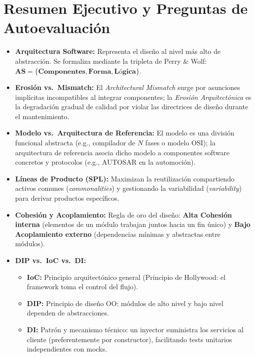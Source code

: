 \section{Resumen Ejecutivo y Preguntas de Autoevaluación}
\label{sec:resumen-autoevaluacion}

\begin{tcolorbox}[
  enhanced,
  colback=secondary!5!bglight,
  colframe=secondary,
  arc=3mm,
  boxrule=1pt,
  title={\bfseries\color{white} Resumen Sintético de Conceptos Clave},
  coltitle=white
]
\begin{itemize}[leftmargin=1.5em]
  \item \textbf{Arquitectura Software:} Representa el diseño al nivel más alto de abstracción. Se formaliza mediante la tripleta de Perry \& Wolf: $\mathbf{AS = \{\text{Componentes}, \text{Forma}, \text{Lógica}\}}$.
  \item \textbf{Erosión vs.\ Mismatch:} El \emph{Architectural Mismatch} surge por asunciones implícitas incompatibles al integrar componentes; la \emph{Erosión Arquitectónica} es la degradación gradual de calidad por violar las directrices de diseño durante el mantenimiento.
  \item \textbf{Modelo vs.\ Arquitectura de Referencia:} El modelo es una división funcional abstracta (e.g., compilador de $N$ fases o modelo OSI); la arquitectura de referencia asocia dicho modelo a componentes software concretos y protocolos (e.g., AUTOSAR en la automoción).
  \item \textbf{Líneas de Producto (SPL):} Maximizan la reutilización compartiendo activos comunes (\emph{commonalities}) y gestionando la variabilidad (\emph{variability}) para derivar productos específicos.
  \item \textbf{Cohesión y Acoplamiento:} Regla de oro del diseño: \textbf{Alta Cohesión interna} (elementos de un módulo trabajan juntos hacia un fin único) y \textbf{Bajo Acoplamiento externo} (dependencias mínimas y abstractas entre módulos).
  \item \textbf{DIP vs.\ IoC vs.\ DI:}
    \begin{itemize}
      \item \textbf{IoC:} Principio arquitectónico general (Principio de Hollywood: el framework toma el control del flujo).
      \item \textbf{DIP:} Principio de diseño OO: módulos de alto nivel y bajo nivel dependen de abstracciones.
      \item \textbf{DI:} Patrón y mecanismo técnico: un inyector suministra los servicios al cliente (preferentemente por constructor), facilitando tests unitarios independientes con mocks.
    \end{itemize}
\end{itemize}
\end{tcolorbox}

